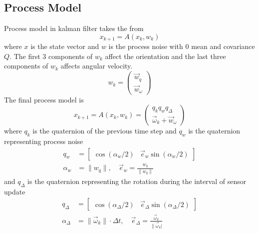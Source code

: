 \documentclass[twoside]{article}
\begin{document}
\begin{multicols}{2}
\subsection{Process Model}
Process model in kalman filter takes the from
\begin{equation}
x_{k+1} = A(x_k, w_k)    
\end{equation}
where $x$ is the state vector and $w$ is the process noise with $0$ mean and covariance $Q$. The first 3 components of $w_k$ affect the orientation and the last three components of $w_k$ affects angular velocity.
\begin{equation}
w_k = \begin{pmatrix}\vec{w}_q \\ \vec{w}_\omega \end{pmatrix}
\end{equation}
The final process model is 
\begin{equation}
x_{k+1} = A(x_k, w_k) = \begin{pmatrix} q_k q_w q_{\Delta}\\ \vec{\omega}_k + \vec{w}_\omega \end{pmatrix}
\end{equation}
where $q_k$ is the quaternion of the previous time step and $q_w$ is the quaternion representing process noise
\begin{align}
q_w &= \begin{bmatrix}
\cos\left(\alpha_w/2\right) & \vec{e}_w \sin \left(\alpha_w/2 \right)\end{bmatrix}\\
\alpha_w &= \|w_q\|, \quad \vec{e}_w = \frac{w_q}{\|w_q\|}
\end{align}
and $q_\Delta$ is the quaternion representing the rotation during the interval of sensor update
\begin{align}
q_\Delta &= \begin{bmatrix}
\cos\left(\alpha_\Delta/2\right) & \vec{e}_\Delta \sin \left(\alpha_\Delta/2\right)\end{bmatrix}\\
\alpha_\Delta &= \|\vec{\omega}_k\|\cdot \Delta t, \quad \vec{e}_\Delta = \frac{\vec{\omega}_k}{\|\vec{\omega}_k|}
\end{align}


\end{multicols}
\end{document}
